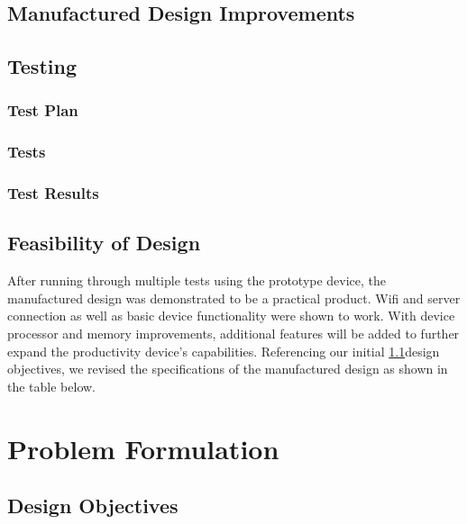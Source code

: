 \documentclass{article}
\begin{document}
\subsection{Manufactured Design Improvements} \label{improvements}


\newpage

\subsection{Testing}
\subsubsection{Test Plan}


\newpage

\subsubsection{Tests}


\subsubsection{Test Results}


\subsection{Feasibility of Design} \label{final_specs}
After running through multiple tests using the prototype device, the manufactured design was demonstrated to be a practical product. Wifi and server connection as well as basic device functionality were shown to work. With device processor and memory improvements, additional features will be added to further expand the productivity device's capabilities.
Referencing our initial \ref{design_obj}{design objectives}, we revised the specifications of the manufactured design as shown in the table below.



\newpage
\appendix
\appendixpage

\section{Problem Formulation}
\subsection{Design Objectives} \label{design_obj}


\end{document}
